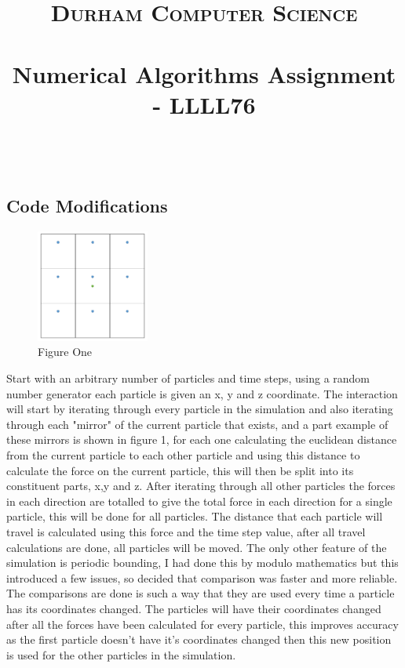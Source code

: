 \documentclass[paper=a4, fontsize=11pt]{scrartcl}
\date{}
\title{
		\vspace{-1in} 	
		\usefont{OT1}{bch}{b}{n}
		\normalfont \normalsize \textsc{Durham Computer Science} \\ [5pt]
		\horrule{0.5pt} \\[0.4cm]
		\huge Numerical Algorithms Assignment - LLLL76\\
		\horrule{2pt} \\[0.5cm]
		\vspace{-1in} 	
}
\numberwithin{equation}{section}		%
\numberwithin{figure}{section}			%
\numberwithin{table}{section}				%
\begin{document}
\maketitle
\section{}
\subsection{Code Modifications}

\begin{figure} %
    \centering
    \caption{Figure One}
    \includegraphics[width=0.33\textwidth]{9.png}
\end{figure}

Start with an arbitrary number of particles and time steps, using a random number generator each particle is given an x, y and z coordinate. The interaction will start by iterating through every particle in the simulation and also iterating through each "mirror" of the current particle that exists, and a part example of these mirrors is shown in figure 1, for each one calculating the euclidean distance from the current particle to each other particle and using this distance to calculate the force on the current particle, this will then be split into its constituent parts, x,y and z. After iterating through all other particles the forces in each direction are totalled to give the total force in each direction for a single particle, this will be done for all particles. The distance that each particle will travel is calculated using this force and the time step value, after all travel calculations are done, all particles will be moved. The only other feature of the simulation is periodic bounding, I had done this by modulo mathematics but this introduced a few issues, so decided that comparison was faster and more reliable. The comparisons are done is such a way that they are used every time a particle has its coordinates changed. The particles will have their coordinates changed after all the forces have been calculated for every particle, this improves accuracy as the first particle doesn't have it's coordinates changed then this new position is used for the other particles in the simulation.
\end{document}
